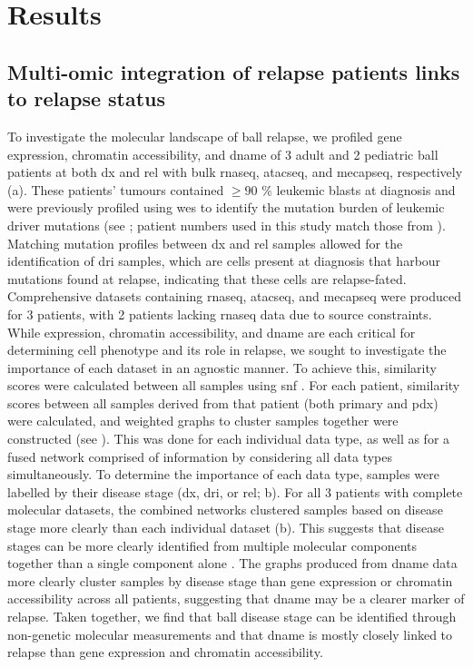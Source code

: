 \section{Results}

\subsection{Multi-omic integration of  relapse patients links  to relapse status}

To investigate the molecular landscape of \gls{ball} relapse, we profiled gene expression, chromatin accessibility, and \gls{dname} of 3 adult and 2 pediatric \gls{ball} patients at both \gls{dx} and \gls{rel} with bulk \gls{rnaseq}, \gls{atacseq}, and \gls{mecapseq}, respectively (a).
These patients' tumours contained $\ge 90$ \% leukemic blasts at diagnosis and were previously profiled using \gls{wes} to identify the mutation burden of leukemic driver mutations \cite{dobsonRelapseFatedLatentDiagnosis2020} (see ; patient numbers used in this study match those from \cite[REF][]{dobsonRelapseFatedLatentDiagnosis2020}).
Matching mutation profiles between \gls{dx} and \gls{rel} samples allowed for the identification of \gls{dri} samples, which are cells present at diagnosis that harbour mutations found at relapse, indicating that these cells are relapse-fated.
Comprehensive datasets containing \gls{rnaseq}, \gls{atacseq}, and \gls{mecapseq} were produced for 3 patients, with 2 patients lacking \gls{rnaseq} data due to source constraints.
While expression, chromatin accessibility, and \gls{dname} are each critical for determining cell phenotype and its role in relapse, we sought to investigate the importance of each dataset in an agnostic manner.
To achieve this, similarity scores were calculated between all samples using \gls{snf} \cite{wangSimilarityNetworkFusion2014}.
For each patient, similarity scores between all samples derived from that patient (both primary and \gls{pdx}) were calculated, and weighted graphs to cluster samples together were constructed (see ).
This was done for each individual data type, as well as for a fused network comprised of information by considering all data types simultaneously.
To determine the importance of each data type, samples were labelled by their disease stage (\gls{dx}, \gls{dri}, or \gls{rel}; b).
For all 3 patients with complete molecular datasets, the combined networks clustered samples based on disease stage more clearly than each individual dataset (b).
This suggests that disease stages can be more clearly identified from multiple molecular components together than a single component alone \cite{wangSimilarityNetworkFusion2014}.
The graphs produced from \gls{dname} data more clearly cluster samples by disease stage than gene expression or chromatin accessibility across all patients, suggesting that \gls{dname} may be a clearer marker of relapse.
Taken together, we find that \gls{ball} disease stage can be identified through non-genetic molecular measurements and that \gls{dname} is mostly closely linked to relapse than gene expression and chromatin accessibility.

